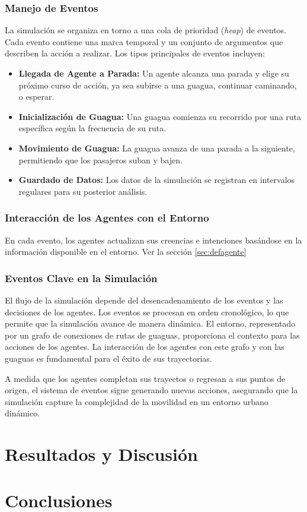 \documentclass[a4paper,12pt]{article}
\begin{document}
\subsubsection{Manejo de Eventos}
La simulación se organiza en torno a una cola de prioridad (\textit{heap}) de eventos. Cada evento contiene una marca temporal y un conjunto de argumentos que describen la acción a realizar. Los tipos principales de eventos incluyen:
\begin{itemize}
    \item \textbf{Llegada de Agente a Parada:} Un agente alcanza una parada y elige su próximo curso de acción, ya sea subirse a una guagua, continuar caminando, o esperar.
    \item \textbf{Inicialización de Guagua:} Una guagua comienza su recorrido por una ruta específica según la frecuencia de su ruta.
    \item \textbf{Movimiento de Guagua:} La guagua avanza de una parada a la siguiente, permitiendo que los pasajeros suban y bajen.
    \item \textbf{Guardado de Datos:} Los datos de la simulación se registran en intervalos regulares para su posterior análisis.
\end{itemize}

\subsubsection{Interacción de los Agentes con el Entorno}
En cada evento, los agentes actualizan sus creencias e intenciones basándose en la información disponible en el entorno.  Ver la secci\'on \ref{sec:defagente}

\subsubsection{Eventos Clave en la Simulación}
El flujo de la simulación depende del desencadenamiento de los eventos y las decisiones de los agentes. Los eventos se procesan en orden cronológico, lo que permite que la simulación avance de manera dinámica. El entorno, representado por un grafo de conexiones de rutas de guaguas, proporciona el contexto para las acciones de los agentes. La interacción de los agentes con este grafo y con las guaguas es fundamental para el éxito de sus trayectorias.

A medida que los agentes completan sus trayectos o regresan a sus puntos de origen, el sistema de eventos sigue generando nuevas acciones, asegurando que la simulación capture la complejidad de la movilidad en un entorno urbano dinámico.



\section{Resultados y Discusi\'on}

\section{Conclusiones}


\end{document}
